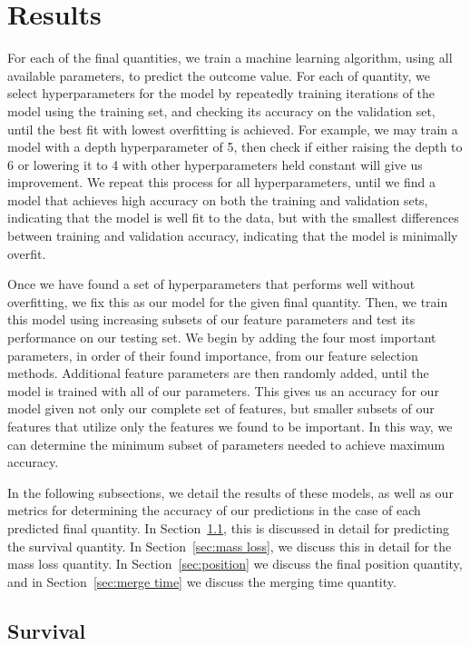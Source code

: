 \documentclass[fleqn,usenatbib]{mnras}
\begin{document}
\section{Results}
\label{sec:Results}
For each of the final quantities, we train a machine learning algorithm, using all available parameters, to predict the outcome value. For each of quantity, we select hyperparameters for the model by repeatedly training iterations of the model using the training set, and checking its accuracy on the validation set, until the best fit with lowest overfitting is achieved. For example, we may train a model with a depth hyperparameter of 5, then check if either raising the depth to 6 or lowering it to 4 with other hyperparameters held constant will give us improvement. We repeat this process for all hyperparameters, until we find a model that achieves high accuracy on both the training and validation sets, indicating that the model is well fit to the data, but with the smallest differences between training and validation accuracy, indicating that the model is minimally overfit.

Once we have found a set of hyperparameters that performs well without overfitting, we fix this as our model for the given final quantity. Then, we train this model using increasing subsets of our feature parameters and test its performance on our testing set. We begin by adding the four most important parameters, in order of their found importance, from our feature selection methods. Additional feature parameters are then randomly added, until the model is trained with all of our parameters. This gives us an accuracy for our model given not only our complete set of features, but smaller subsets of our features that utilize only the features we found to be important. In this way, we can determine the minimum subset of parameters needed to achieve maximum accuracy. 

In the following subsections, we detail the results of these models, as well as our metrics for determining the accuracy of our predictions in the case of each predicted final quantity. In Section~\ref{sec:survival}, this is discussed in detail for predicting the survival quantity. In Section~\ref{sec:mass loss}, we discuss this in detail for the mass loss quantity. In Section~\ref{sec:position} we discuss the final position quantity, and in Section~\ref{sec:merge time} we discuss the merging time quantity.

\subsection{Survival}
\label{sec:survival} %
\end{document}
